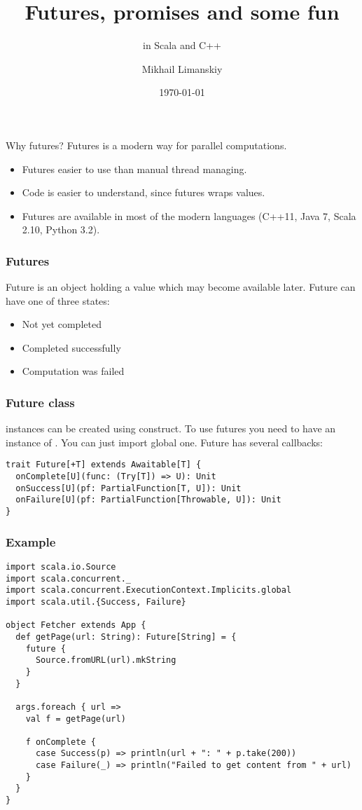 \documentclass{beamer}
\title{Futures, promises and some fun}
\subtitle{in Scala and C++}
\author{Mikhail Limanskiy}
\institute{SymphonyTeleca}
\date{\today}
\begin{document}
\begin{frame}
    \titlepage
\end{frame}

\begin{frame}{Why futures?}
Futures is a modern way for parallel computations.
\begin{itemize}
\item Futures easier to use than manual thread managing.
\item Code is easier to understand, since futures wraps values.
\item Futures are available in most of the modern languages (C++11, Java 7, Scala 2.10, Python 3.2).
\end{itemize}
\end{frame}

\begin{frame}
\frametitle{Futures}
Future is an object holding a value which may become available later.  Future can have one of three states:
\begin{itemize}
\item Not yet completed
\item Completed successfully
\item Computation was failed
\end{itemize}
\end{frame}

\begin{frame}[fragile]
\frametitle{Future class}
 instances can be created using  construct. 
To use futures you need to have an instance of . You can just import global one.
Future has several callbacks:
\begin{lstlisting}
trait Future[+T] extends Awaitable[T] {
  onComplete[U](func: (Try[T]) => U): Unit
  onSuccess[U](pf: PartialFunction[T, U]): Unit
  onFailure[U](pf: PartialFunction[Throwable, U]): Unit
}
\end{lstlisting}
\end{frame}

\begin{frame}[fragile]
\frametitle{Example}
\begin{lstlisting}
import scala.io.Source
import scala.concurrent._
import scala.concurrent.ExecutionContext.Implicits.global
import scala.util.{Success, Failure}

object Fetcher extends App {
  def getPage(url: String): Future[String] = {
    future {
      Source.fromURL(url).mkString
    }
  }

  args.foreach { url =>
    val f = getPage(url)

    f onComplete {
      case Success(p) => println(url + ": " + p.take(200))
      case Failure(_) => println("Failed to get content from " + url)
    }
  }
}
\end{lstlisting}
\end{frame}
\end{document}
